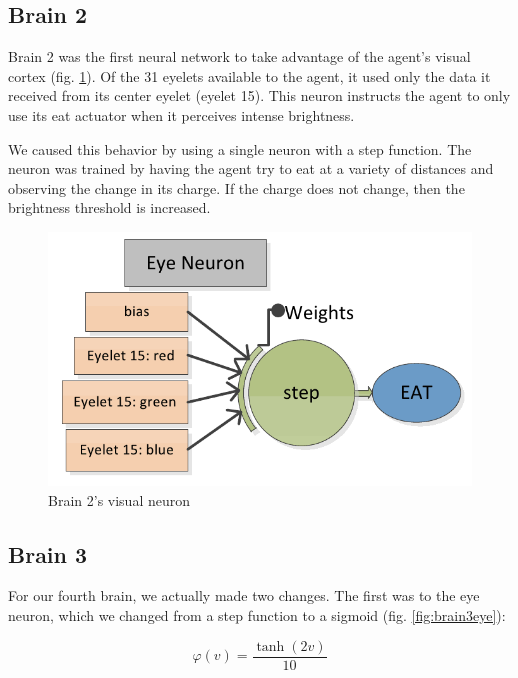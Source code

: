 \subsection{Brain 2}

Brain 2 was the first neural network to take advantage of the agent's visual
cortex (fig. \ref{fig:brain2}). Of the 31 eyelets available to the agent, it 
used only the data it received from its center eyelet (eyelet 15). This
neuron instructs the agent to only use its eat actuator when it perceives
intense brightness. 

We caused this behavior by using a single neuron with a step function. 
The neuron was trained by having the agent try to eat at a variety of 
distances and observing the change in its charge. If the charge does not
change, then the brightness threshold is increased.

\begin{figure}
\begin{center}
  \includegraphics[scale=.3]{img/brain2.png}
  \caption{Brain 2's visual neuron}
  \label{fig:brain2}
\end{center}
\end{figure}

\subsection{Brain 3}

For our fourth brain, we actually made two changes. The first was to the
eye neuron, which we changed from a step function to a sigmoid 
(fig. \ref{fig:brain3eye}):

\begin{equation} \label{eq:eyesig}
  \varphi(v) = \frac{\tanh(2v)}{10}
\end{equation}

